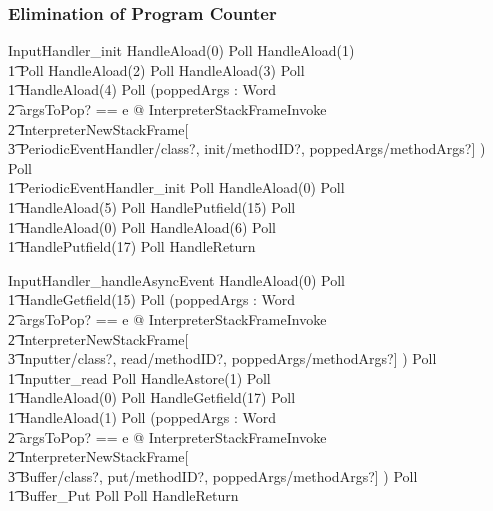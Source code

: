 \documentclass{beamer}
\begin{document}
\begin{frame}[shrink]
  \frametitle{Elimination of Program Counter}
  \setlength{\zedleftsep}{0cm}
  \setlength{\zedindent}{0cm}
  \begin{circus}
    InputHandler\_init \circdef HandleAload(0) \circseq Poll \circseq HandleAload(1) \circseq \\
    \t1 Poll \circseq HandleAload(2) \circseq Poll \circseq HandleAload(3) \circseq Poll \circseq \\
    \t1 HandleAload(4) \circseq Poll \circseq (\circvar poppedArgs : \seq Word \circspot \\
    \t2 \lschexpract \exists argsToPop? == e @ InterpreterStackFrameInvoke \rschexpract \circseq \\
    \t2 \lschexpract InterpreterNewStackFrame[ \\
    \t3 PeriodicEventHandler/class?,  init/methodID?, poppedArgs/methodArgs?] \rschexpract) \circseq Poll \circseq \\
    \t1 PeriodicEventHandler\_init \circseq Poll \circseq HandleAload(0) \circseq Poll \circseq \\
    \t1 HandleAload(5) \circseq Poll \circseq HandlePutfield(15) \circseq Poll \circseq \\
    \t1 HandleAload(0) \circseq Poll \circseq HandleAload(6) \circseq Poll \circseq \\
    \t1 HandlePutfield(17) \circseq Poll \circseq HandleReturn
  \end{circus}
  \begin{circus}
    InputHandler\_handleAsyncEvent \circdef HandleAload(0) \circseq Poll \circseq \\
    \t1 HandleGetfield(15) \circseq Poll \circseq (\circvar poppedArgs : \seq Word \circspot \\
    \t2 \lschexpract \exists argsToPop? == e @ InterpreterStackFrameInvoke \rschexpract \circseq \\
    \t2 \lschexpract InterpreterNewStackFrame[ \\
    \t3 Inputter/class?,  read/methodID?, poppedArgs/methodArgs?] \rschexpract) \circseq Poll \circseq \\
    \t1 Inputter\_read \circseq Poll \circseq HandleAstore(1) \circseq Poll \circseq \\
    \t1 HandleAload(0) \circseq Poll \circseq HandleGetfield(17) \circseq Poll \circseq \\
    \t1 HandleAload(1) \circseq Poll \circseq (\circvar poppedArgs : \seq Word \circspot \\
      \t2 \lschexpract \exists argsToPop? == e @ InterpreterStackFrameInvoke \rschexpract \circseq \\
      \t2 \lschexpract InterpreterNewStackFrame[ \\
      \t3 Buffer/class?,  put/methodID?, poppedArgs/methodArgs?] \rschexpract) \circseq Poll \circseq \\
    \t1 Buffer\_Put \circseq Poll \circseq Poll \circseq HandleReturn
  \end{circus}
\end{frame}
\end{document}
